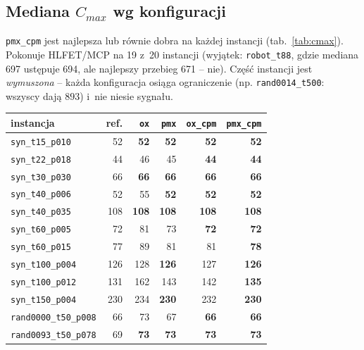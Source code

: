 \documentclass[12pt,a4paper]{article}
\begin{document}
\subsection{Mediana $C_{max}$ wg konfiguracji}
\texttt{pmx\_cpm} jest najlepsza lub równie dobra na każdej instancji (tab.~\ref{tab:cmax}).
Pokonuje HLFET/MCP na 19 z~20 instancji (wyjątek: \texttt{robot\_t88}, gdzie mediana 697 ustępuje
694, ale najlepszy przebieg 671 -- nie). Część instancji jest \emph{wymuszona} -- każda konfiguracja
osiąga ograniczenie (np. \texttt{rand0014\_t500}: wszyscy dają $893$) i~nie niesie sygnału.

\begin{table}[H]
\centering\small\setlength{\tabcolsep}{6pt}
\begin{tabular}{lrrrrr}
\toprule
instancja & ref. & \texttt{ox} & \texttt{pmx} & \texttt{ox\_cpm} & \texttt{pmx\_cpm} \\
\midrule
\texttt{syn\_t15\_p010}       &  52 & \textbf{52}  & \textbf{52}  & \textbf{52}  & \textbf{52} \\
\texttt{syn\_t22\_p018}       &  44 & 46           & 45           & \textbf{44}  & \textbf{44} \\
\texttt{syn\_t30\_p030}       &  66 & \textbf{66}  & \textbf{66}  & \textbf{66}  & \textbf{66} \\
\texttt{syn\_t40\_p006}       &  52 & 55           & \textbf{52}  & \textbf{52}  & \textbf{52} \\
\texttt{syn\_t40\_p035}       & 108 & \textbf{108} & \textbf{108} & \textbf{108} & \textbf{108} \\
\texttt{syn\_t60\_p005}       &  72 & 81           & 73           & \textbf{72}  & \textbf{72} \\
\texttt{syn\_t60\_p015}       &  77 & 89           & 81           & 81           & \textbf{78} \\
\texttt{syn\_t100\_p004}      & 126 & 128          & \textbf{126} & 127          & \textbf{126} \\
\texttt{syn\_t100\_p012}      & 131 & 162          & 143          & 142          & \textbf{135} \\
\texttt{syn\_t150\_p004}      & 230 & 234          & \textbf{230} & 232          & \textbf{230} \\
\midrule
\texttt{rand0000\_t50\_p008}  &  66 & 73           & 67           & \textbf{66}  & \textbf{66} \\
\texttt{rand0093\_t50\_p078}  &  69 & \textbf{73}  & \textbf{73}  & \textbf{73}  & \textbf{73} \\

\end{tabular}
\end{table}
\end{document}
